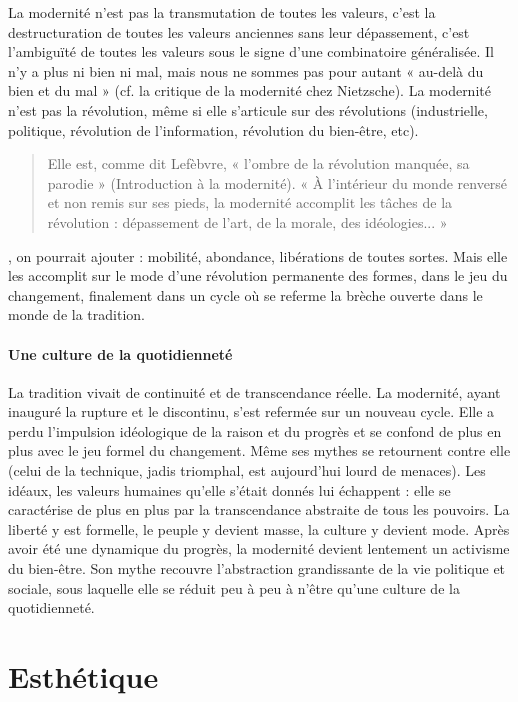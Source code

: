 La modernité n'est pas la transmutation de toutes les valeurs, c'est la destructuration de toutes les valeurs anciennes sans leur dépassement, c'est l'ambiguïté de toutes les valeurs sous le signe d'une combinatoire généralisée. Il n'y a plus ni bien ni mal, mais nous ne sommes pas pour autant « au-delà du bien et du mal » (cf. la critique de la modernité chez Nietzsche).
La modernité n'est pas la révolution, même si elle s'articule sur des révolutions (industrielle, politique, révolution de l'information, révolution du bien-être, etc). \begin{quote}
    Elle est, comme dit Lefèbvre, « l'ombre de la révolution manquée, sa parodie » (Introduction à la modernité). « À l'intérieur du monde renversé et non remis sur ses pieds, la modernité accomplit les tâches de la révolution : dépassement de l'art, de la morale, des idéologies... »
\end{quote} , on pourrait ajouter :
mobilité, abondance, libérations de toutes sortes. Mais elle les accomplit sur le mode d'une révolution permanente des formes, dans le jeu du changement, finalement dans un cycle où se referme la brèche ouverte dans le monde de la tradition.
\paragraph{Une culture de la quotidienneté}

La tradition vivait de continuité et de transcendance réelle. La modernité, ayant inauguré la rupture et le discontinu, s'est refermée sur un nouveau cycle. Elle a perdu l'impulsion idéologique de la raison et du progrès et se confond de plus en plus avec le jeu formel du changement. Même ses mythes se retournent contre elle (celui de la technique, jadis triomphal, est aujourd'hui lourd de menaces). Les idéaux, les valeurs humaines qu'elle s'était donnés lui échappent : elle se caractérise de plus en plus par la transcendance abstraite de tous les pouvoirs. La liberté y est formelle, le peuple y devient masse, la culture y devient mode. Après avoir été une dynamique du progrès, la modernité devient lentement un activisme du bien-être. Son mythe recouvre l'abstraction grandissante de la vie politique et sociale, sous laquelle elle se réduit peu à peu à n'être qu'une culture de la quotidienneté.

\section{Esthétique}


